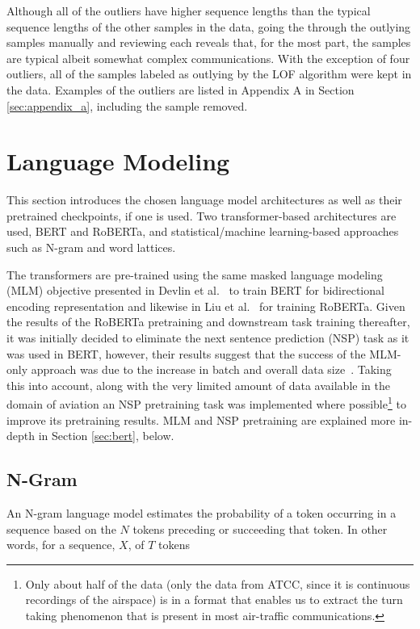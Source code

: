 \documentclass[12pt]{article}
\begin{document}
Although all of the outliers have higher sequence lengths than the typical sequence lengths of the other samples in the data, going the through
the outlying samples manually and reviewing each reveals that, for the most part, the samples are typical albeit somewhat complex communications.
With the exception of four outliers, all of the samples labeled as outlying by the LOF algorithm were kept in the data. Examples of the outliers are
listed in Appendix A in Section \ref{sec:appendix_a}, including the sample removed.

\section{Language Modeling}\label{sec:language_modeling}
This section introduces the chosen language model architectures as well as their pretrained checkpoints, if one is used. Two transformer-based
architectures are used, BERT and RoBERTa, and statistical/machine learning-based approaches such as N-gram and word lattices.

The transformers are pre-trained using the same masked language modeling (MLM) objective presented in Devlin et al.~\cite{devlin_bert_2019} to train
BERT for bidirectional encoding representation and likewise in Liu et al.~\cite{liu_roberta_2019} for training RoBERTa. Given the results of the
RoBERTa pretraining and downstream task training thereafter, it was initially decided to eliminate the next sentence prediction (NSP) task as it was
used in BERT, however, their results suggest that the success of the MLM-only approach was due to the increase in batch and overall data
size~\cite{liu_roberta_2019}. Taking this into account, along with the very limited amount of data available in the domain of aviation an NSP
pretraining task was implemented where possible\footnote{Only about half of the data (only the data from ATCC, since it is continuous recordings of
    the airspace) is in a format that enables us to extract the turn taking phenomenon that is present in most air-traffic communications.} to improve
its pretraining results. MLM and NSP pretraining are explained more in-depth in Section \ref{sec:bert}, below.

\subsection{N-Gram}\label{sec:ngram}
An N-gram language model estimates the probability of a token occurring in a sequence based on the \(N\) tokens preceding or succeeding that token.
In other words, for a sequence, $X$, of $T$ tokens
\end{document}

